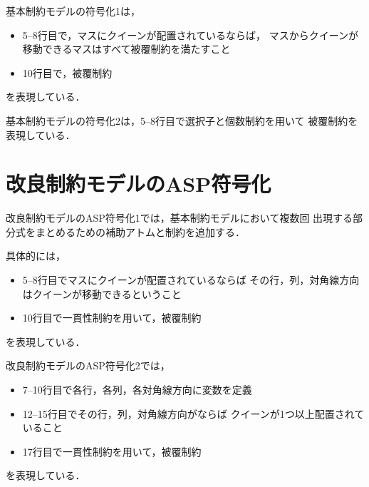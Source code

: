 

基本制約モデルの符号化1は，
\begin{itemize}
 \item 5--8行目で，マスにクイーンが配置されているならば，
  マスからクイーンが移動できるマスはすべて被覆制約を満たすこと
 \item 10行目で，被覆制約
\end{itemize}
を表現している．




基本制約モデルの符号化2は，5--8行目で選択子と個数制約を用いて
被覆制約を表現している．
\newpage
\section{改良制約モデルのASP符号化}


改良制約モデルのASP符号化1では，基本制約モデルにおいて複数回
出現する部分式をまとめるための補助アトムと制約を追加する．

具体的には，
\begin{itemize}
  \item 5--8行目でマスにクイーンが配置されているならば
    その行，列，対角線方向はクイーンが移動できるということ
  \item 10行目で一貫性制約を用いて，被覆制約
\end{itemize}
を表現している．



\newpage
改良制約モデルのASP符号化2では，
\begin{itemize}
 \item 7--10行目で各行，各列，各対角線方向に変数を定義
 \item 12--15行目でその行，列，対角線方向がならば
  クイーンが1つ以上配置されていること
 \item 17行目で一貫性制約を用いて，被覆制約
\end{itemize}
を表現している．

